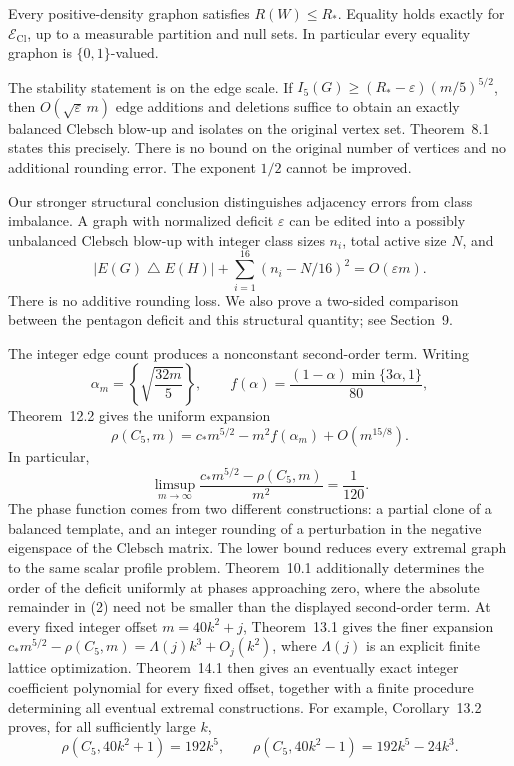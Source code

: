 \begin{theorem}\label{thm:graphon}
Every positive-density graphon satisfies \(R(W)\le R_*\).
Equality holds exactly for \(\mathcal E_{\mathrm{Cl}}\), up to a measurable
partition and null sets. In particular every equality graphon is
\(\{0,1\}\)-valued.
\end{theorem}

The stability statement is on the edge scale. If
\(I_5(G)\ge (R_*-\varepsilon)(m/5)^{5/2}\), then
\(O(\sqrt{\varepsilon}\,m)\) edge additions and deletions suffice to obtain
an exactly balanced Clebsch blow-up and isolates on the original vertex
set. Theorem~8.1 states this precisely. There is no bound on the original
number of vertices and no additional rounding error. The exponent \(1/2\)
cannot be improved.

Our stronger structural conclusion distinguishes adjacency errors from
class imbalance. A graph with normalized deficit \(\varepsilon\) can be
edited into a possibly unbalanced Clebsch blow-up with integer class sizes
\(n_i\), total active size \(N\), and
\[
 |E(G)\mathbin{\triangle}E(H)|
       +\sum_{i=1}^{16}(n_i-N/16)^2=O(\varepsilon m).
\]
There is no additive rounding loss. We also prove a two-sided comparison
between the pentagon deficit and this structural quantity; see Section~9.

The integer edge count produces a nonconstant second-order term. Writing
\[
 \alpha_m=\left\{\sqrt{\frac{32m}{5}}\right\},\qquad
 f(\alpha)=\frac{(1-\alpha)\min\{3\alpha,1\}}{80},
\]
Theorem~12.2 gives the uniform expansion
\begin{equation}
 \rho(C_5,m)=c_*m^{5/2}-m^2f(\alpha_m)+O(m^{15/8}).\tag{2}
\end{equation}
In particular,
\[
 \limsup_{m\to\infty}\frac{c_*m^{5/2}-\rho(C_5,m)}{m^2}
 =\frac1{120}.
\]
The phase function comes from two different constructions: a partial clone
of a balanced template, and an integer rounding of a perturbation in the
negative eigenspace of the Clebsch matrix. The lower bound reduces every
extremal graph to the same scalar profile problem. Theorem~10.1 additionally
determines the order of the deficit uniformly at phases approaching zero,
where the absolute remainder in (2) need not be smaller than the displayed
second-order term. At every fixed integer offset \(m=40k^2+j\),
Theorem~13.1 gives the finer expansion
\(c_*m^{5/2}-\rho(C_5,m)=\Lambda(j)k^3+O_j(k^2)\), where \(\Lambda(j)\) is
an explicit finite lattice optimization. Theorem~14.1 then gives an
eventually exact integer coefficient polynomial for every fixed offset,
together with a finite procedure determining all eventual extremal
constructions. For example, Corollary~13.2 proves, for all sufficiently
large \(k\),
\[
 \rho(C_5,40k^2+1)=192k^5,\qquad
 \rho(C_5,40k^2-1)=192k^5-24k^3.
\]

